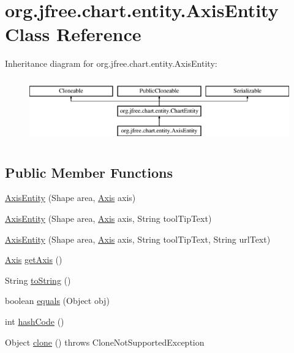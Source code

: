 \hypertarget{classorg_1_1jfree_1_1chart_1_1entity_1_1_axis_entity}{}\section{org.\+jfree.\+chart.\+entity.\+Axis\+Entity Class Reference}
\label{classorg_1_1jfree_1_1chart_1_1entity_1_1_axis_entity}
Inheritance diagram for org.\+jfree.\+chart.\+entity.\+Axis\+Entity\+:\begin{figure}[H]
\begin{center}
\leavevmode
\includegraphics[height=2.772277cm]{classorg_1_1jfree_1_1chart_1_1entity_1_1_axis_entity}
\end{center}
\end{figure}
\subsection*{Public Member Functions}
\begin{DoxyCompactItemize}
\item 
\mbox{\hyperlink{classorg_1_1jfree_1_1chart_1_1entity_1_1_axis_entity_a10e546516c513fb7db0530e07a2540ac}{Axis\+Entity}} (Shape area, \mbox{\hyperlink{classorg_1_1jfree_1_1chart_1_1axis_1_1_axis}{Axis}} axis)
\item 
\mbox{\hyperlink{classorg_1_1jfree_1_1chart_1_1entity_1_1_axis_entity_a4d37a3d94744e53f3c19db85833035e8}{Axis\+Entity}} (Shape area, \mbox{\hyperlink{classorg_1_1jfree_1_1chart_1_1axis_1_1_axis}{Axis}} axis, String tool\+Tip\+Text)
\item 
\mbox{\hyperlink{classorg_1_1jfree_1_1chart_1_1entity_1_1_axis_entity_acc42deee6b1f588f5e84ea95f41682a8}{Axis\+Entity}} (Shape area, \mbox{\hyperlink{classorg_1_1jfree_1_1chart_1_1axis_1_1_axis}{Axis}} axis, String tool\+Tip\+Text, String url\+Text)
\item 
\mbox{\hyperlink{classorg_1_1jfree_1_1chart_1_1axis_1_1_axis}{Axis}} \mbox{\hyperlink{classorg_1_1jfree_1_1chart_1_1entity_1_1_axis_entity_aa3fb33fb4490c5d33853003656e03f3c}{get\+Axis}} ()
\item 
String \mbox{\hyperlink{classorg_1_1jfree_1_1chart_1_1entity_1_1_axis_entity_a37c00e97ee05bce8d81f789584b95694}{to\+String}} ()
\item 
boolean \mbox{\hyperlink{classorg_1_1jfree_1_1chart_1_1entity_1_1_axis_entity_a7339bc6369f9336331b1b99b09e7d90e}{equals}} (Object obj)
\item 
int \mbox{\hyperlink{classorg_1_1jfree_1_1chart_1_1entity_1_1_axis_entity_a8bc4e803d17aaafaa9d205093b13ec84}{hash\+Code}} ()
\item 
Object \mbox{\hyperlink{classorg_1_1jfree_1_1chart_1_1entity_1_1_axis_entity_af4ac4cf3ba5179dd2b5a999d23c62f20}{clone}} ()  throws Clone\+Not\+Supported\+Exception 
\end{DoxyCompactItemize}


